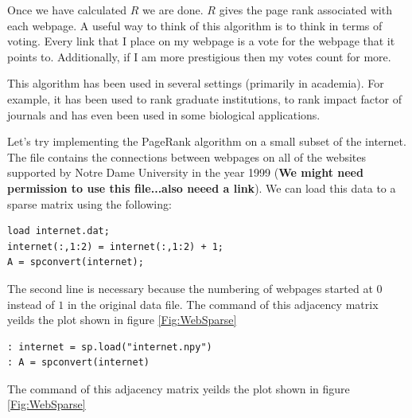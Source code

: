 Once we have calculated $R$ we are done. $R$ gives the page rank associated with each webpage. A useful way to think of this algorithm is to think in terms of voting. Every link that I place on my webpage is a vote for the webpage that it points to. Additionally, if I am more prestigious then my votes count for more.

This algorithm has been used in several settings (primarily in academia). For example, it has been used to rank graduate institutions, to rank impact factor of journals and has even been used in some biological applications.

Let's try implementing the PageRank algorithm on a small subset of the internet. The file  contains the connections between webpages on all of the websites supported by Notre Dame University in the year 1999 ({\bf We might need permission to use this file...also neeed a link}). We can load this data to a sparse matrix using the following:

\begin{matlab}
\begin{lstlisting}[style=matlab]
load internet.dat;
internet(:,1:2) = internet(:,1:2) + 1;
A = spconvert(internet);
\end{lstlisting}

The second line is necessary because the numbering of webpages started at $0$ instead of $1$ in the original data file. The  command of this adjacency matrix yeilds the plot shown in figure \ref{Fig:WebSparse}
\end{matlab}

\begin{python}
\begin{lstlisting}[style=python]
: internet = sp.load("internet.npy")
: A = spconvert(internet)
\end{lstlisting}
The  command of this adjacency matrix yeilds the plot shown in figure \ref{Fig:WebSparse}
\end{python}


